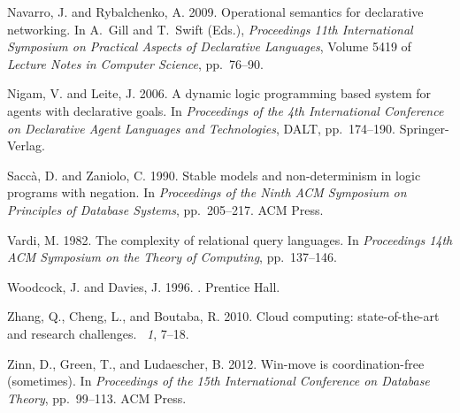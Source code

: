 \documentclass{tlp}
\begin{document}
\begin{thebibliography}{}
{\sc Navarro, J.} {\sc and} {\sc Rybalchenko, A.} 2009.
\newblock Operational semantics for declarative networking.
\newblock In {\sc A.~Gill} {\sc and} {\sc T.~Swift} (Eds.), {\em Proceedings
  11th International Symposium on Practical Aspects of Declarative Languages},
  Volume 5419 of {\em Lecture Notes in Computer Science}, pp.\  76--90.

{\sc Nigam, V.} {\sc and} {\sc Leite, J.} 2006.
\newblock A dynamic logic programming based system for agents with declarative
  goals.
\newblock In {\em Proceedings of the 4th International Conference on
  Declarative Agent Languages and Technologies}, DALT, pp.\  174--190.
  Springer-Verlag.

{\sc Sacc\`a, D.} {\sc and} {\sc Zaniolo, C.} 1990.
\newblock Stable models and non-determinism in logic programs with negation.
\newblock In {\em Proceedings of the Ninth {ACM} Symposium on Principles of
  Database Systems}, pp.\  205--217. ACM Press.

{\sc Vardi, M.} 1982.
\newblock The complexity of relational query languages.
\newblock In {\em Proceedings 14th ACM Symposium on the Theory of Computing},
  pp.\  137--146.

{\sc Woodcock, J.} {\sc and} {\sc Davies, J.} 1996.
.
\newblock Prentice Hall.

{\sc Zhang, Q.}, {\sc Cheng, L.}, {\sc and} {\sc Boutaba, R.} 2010.
\newblock Cloud computing: state-of-the-art and research challenges.
~{\em 1}, 7--18.

{\sc Zinn, D.}, {\sc Green, T.}, {\sc and} {\sc Ludaescher, B.} 2012.
\newblock Win-move is coordination-free (sometimes).
\newblock In {\em Proceedings of the 15th International Conference on Database
  Theory}, pp.\  99--113. ACM Press.

\end{thebibliography}
 
\end{document}
